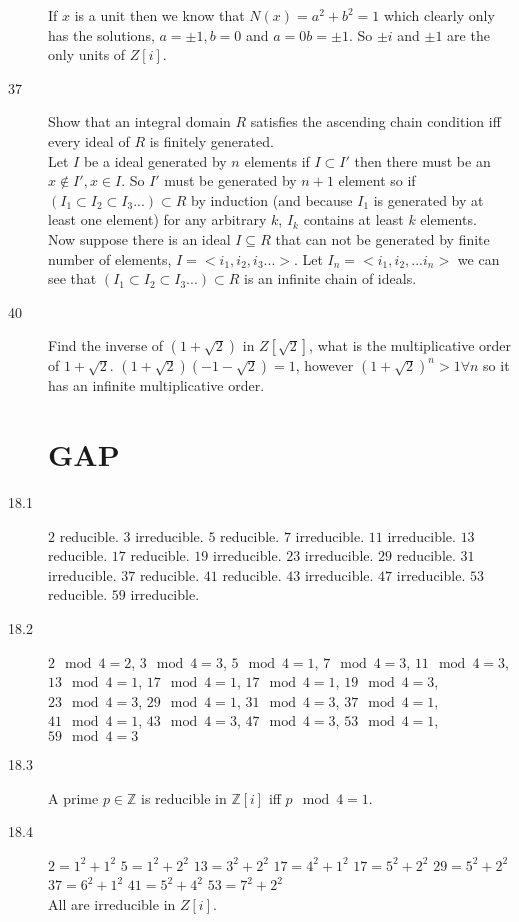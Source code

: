 \documentclass[11pt]{article}
\newcommand{\Z}{\mathbb{Z}}
\begin{document}
\begin{description}
		If $x$ is a unit then we know that $N(x) = a^2+b^2 = 1$ which
		clearly only has the solutions, $a = \pm1, b = 0$ and $a = 0 b =
		\pm 1$.
		So $\pm i$ and $\pm 1$ are the only units of $Z[i]$.
	\item[37]
		Show that an integral domain $R$ satisfies the ascending chain
		condition iff every ideal of $R$ is finitely generated. \\
		Let $I$ be a ideal generated by $n$ elements if $I \subset I'$
		then there must be an $x \not\in I', x\in I$. So $I'$ must be generated by
		$n+1$ element so if $(I_1 \subset I_2 \subset I_3 ...) \subset R$ by
		induction (and because $I_1$ is generated by at least one
		element) for
		any arbitrary $k$, $I_k$ contains at least $k$ elements.\\
		Now suppose there is an ideal $I \subseteq R$ that can not be generated by finite
		number of elements, $I = <i_1, i_2, i_3 ... >$. Let $I_n = <i_1,
		i_2, ... i_n>$ we can see that $(I_1 \subset I_2 \subset I_3
		...)
		\subset R$ is an infinite chain of ideals.
	\item[40] Find the inverse of $(1 + \sqrt2)$ in $Z[\sqrt2]$, what is the
		multiplicative order of $1 + \sqrt2$.
		$(1+ \sqrt2)(-1 - \sqrt 2) = 1$,  however $(1+\sqrt2)^n > 1
		\forall n$  so it has an infinite multiplicative order.
	\section{GAP}
	\item[18.1]
		$2$ reducible.
		$3$ irreducible.
		$5$ reducible.
		$7$ irreducible.
		$11$ irreducible.
		$13$ reducible.
		$17$ reducible.
		$19$ irreducible.
		$23$ irreducible.
		$29$ reducible.
		$31$ irreducible.
		$37$ reducible.
		$41$ reducible.
		$43$ irreducible.
		$47$ irreducible.
		$53$ reducible.
		$59$ irreducible.
	\item[18.2]
		$2 \mod4 = 2$,
		$3 \mod4 = 3$,
		$5 \mod4 = 1$,
		$7 \mod4 = 3$,
		$11 \mod4 = 3$,
		$13 \mod4 = 1$,
		$17 \mod4 = 1$,
		$17 \mod4 = 1$,
		$19 \mod4 = 3$,
		$23 \mod4 = 3$,
		$29 \mod4 = 1$,
		$31 \mod4 = 3$,
		$37 \mod4 = 1$,
		$41 \mod4 = 1$,
		$43 \mod4 = 3$,
		$47 \mod4 = 3$,
		$53 \mod4 = 1$,
		$59 \mod4 = 3$ 
	\item[18.3]
		A prime $p\in \Z$ is reducible in $\Z[i]$ iff $p \mod 4 = 1$.
	\item[18.4]
		$2 = 1^2 + 1^2$
		$5 = 1^2 + 2^2$
		$13 = 3^2 + 2^2$
		$17 = 4^2 + 1^2$
		$17 = 5^2 + 2^2$
		$29 = 5^2 + 2^2$
		$37 = 6^2 + 1^2$
		$41 = 5^2 + 4^2$
		$53 = 7^2 + 2^2$\\
		All are irreducible in $Z[i]$.
\end{description}
\end{document}
